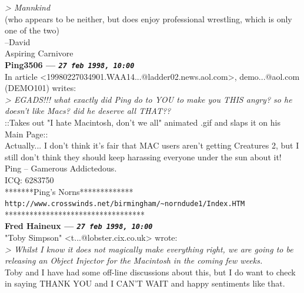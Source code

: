 \documentclass[11pt,twoside,a4paper]{article}
\begin{document}
\begin{multicols*}{2}
\emph{> Mannkind}~\\

(who appears to be neither, but does enjoy professional wrestling, which is only one of the two)~\\

--David~\\
Aspiring Carnivore~\\

 
		
	
		
\textbf{Ping3506 --- \emph{\texttt{27 feb 1998, 10:00}}}~\\

In article <19980227034901.WAA14...@ladder02.news.aol.com>, demo...@aol.com (DEMO101) writes:~\\
\emph{> EGADS!!!  what exactly did Ping do to YOU to make you THIS angry?  so he doesn't like Macs?  did he deserve all THAT??}~\\

::Takes out "I hate Macintosh, don't we all" animated .gif and slaps it on his Main Page::~\\

Actually... I don't think it's fair that MAC users aren't getting Creatures 2, but I still don't think they should keep harassing everyone under the sun about it!~\\

Ping -- Gamerous Addictedous.~\\
ICQ:  6283750~\\
*******Ping's Norns*************~\\
\texttt{http://www.crosswinds.net/birmingham/\textasciitilde norndude1/Index.HTM}~\\
**********************************~\\

 
		
	
		
\textbf{Fred Haineux --- \emph{\texttt{27 feb 1998, 10:00}}}~\\

"Toby Simpson" <t...@lobster.cix.co.uk> wrote:~\\
\emph{> Whilst I know it does not magically make everything right, we are going to be releasing an Object Injector for the Macintosh in the coming few weeks.}~\\

Toby and I have had some off-line discussions about this, but I do want to check in saying THANK YOU and I CAN'T WAIT and happy sentiments like that.~\\


\end{multicols*}
\end{document}
